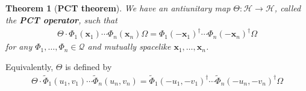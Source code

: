 \documentclass[12pt,b5paper,notitlepage]{article}
\theoremstyle{definition}
\theoremstyle{plain}
\newtheorem{thm}[df]{Theorem}
\newcommand{\mc}{\mathcal}
\newcommand{\wtd}{\widetilde}
\newcommand{\scr}{\mathscr}
\newcommand{\xbf}{\mathbf x}
\numberwithin{equation}{section}
\begin{document}
\subsection{}




\begin{thm}[\textbf{PCT theorem}] \label{lb10}
We have an antiunitary map $\Theta:\mc H\rightarrow\mc H$, called the \textbf{PCT operator},  such that
\begin{align}
\Theta\cdot \Phi_1(\xbf_1)\cdots\Phi_n(\xbf_n)\Omega=\Phi_1(-\xbf_1)^\dagger\cdots\Phi_n(-\xbf_n)^\dagger\Omega
\end{align}
for any $\Phi_1,\dots,\Phi_n\in\scr Q$ and mutually spacelike $\xbf_1,\dots,\xbf_n$.
\end{thm}


Equivalently, $\Theta$ is defined by
\begin{align}\label{eq13}
\Theta\cdot\wtd\Phi_1(u_1,v_1)\cdots\wtd\Phi_n(u_n,v_n)=\wtd\Phi_1(-u_1,-v_1)^\dagger\cdots \wtd\Phi_n(-u_n,-v_n)^\dagger\Omega
\end{align}
\end{document}
